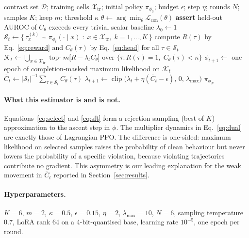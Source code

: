 \documentclass[11pt]{article}
\newcommand{\Cth}{C_{\theta}}
\begin{document}
\begin{algorithm}[t]
\caption{ICRL with Lagrangian rejection sampling}
\label{alg:icrl}
\begin{algorithmic}[1]
\Require contrast set $\mathcal{D}$; training cells $\mathcal{X}_{\text{tr}}$; initial policy
$\pi_{\phi_0}$; budget $\epsilon$; step $\eta$; rounds $N$; samples $K$; keep $m$; threshold $\kappa$
\State $\theta \gets \arg\min_\theta \mathcal{L}_{\text{con}}(\theta)$
\State \textbf{assert} held-out AUROC of $\Cth$ exceeds every trivial scalar baseline
\State $\lambda_0 \gets 1$
  \State $\mathcal{S}_t \gets \{\, \tau_{x}^{(k)} \sim \pi_{\phi_t}(\cdot \mid x) \;:\;
          x \in \mathcal{X}_{\text{tr}}, \; k = 1, \ldots, K \,\}$
  \State compute $R(\tau)$ by Eq.~\eqref{eq:reward} and $\Cth(\tau)$ by Eq.~\eqref{eq:head}
         for all $\tau \in \mathcal{S}_t$
  \State $\mathcal{K}_t \gets \bigcup_{x \in \mathcal{X}_{\text{tr}}}
         \operatorname*{top-}m \big[ R - \lambda_t \Cth \big]$ over
         $\{\tau : R(\tau) = 1, \; \Cth(\tau) < \kappa\}$
  \State $\phi_{t+1} \gets$ one epoch of completion-masked maximum likelihood on
         $\mathcal{K}_t$ 
  \State $\bar{C}_t \gets |\mathcal{S}_t|^{-1} \sum_{\tau \in \mathcal{S}_t} \Cth(\tau)$
  \State $\lambda_{t+1} \gets \operatorname{clip}\big(\lambda_t + \eta (\bar{C}_t - \epsilon),
         \, 0, \, \lambda_{\max}\big)$
\EndFor
\State \Return $\pi_{\phi_N}$
\end{algorithmic}
\end{algorithm}

\paragraph{What this estimator is and is not.} Equations~\eqref{eq:select} and
\eqref{eq:sft} form a rejection-sampling (best-of-$K$) approximation to the ascent step
in $\phi$. The multiplier dynamics in Eq.~\eqref{eq:dual} are exactly those of Lagrangian
PPO. The difference is one-sided: maximum likelihood on selected samples raises the
probability of clean behaviour but never lowers the probability of a specific violation,
because violating trajectories contribute no gradient. This asymmetry is our leading
explanation for the weak movement in $\bar{C}_t$ reported in Section~\ref{sec:results}.

\paragraph{Hyperparameters.} $K = 6$, $m = 2$, $\kappa = 0.5$, $\epsilon = 0.15$,
$\eta = 2$, $\lambda_{\max} = 10$, $N = 6$, sampling temperature $0.7$, LoRA rank $64$
on a 4-bit-quantised base, learning rate $10^{-5}$, one epoch per round.
\end{document}
